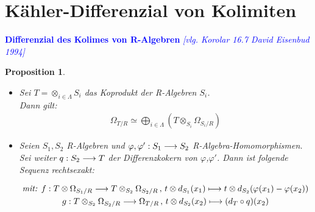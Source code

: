 \documentclass[10pt,a4paper]{report}
\newcommand{\comment}[1]{}
\newcommand{\ModulsOfDifferenzials}{David Eisenbud 1994}
\newcounter{Aussage}[chapter]
\newtheorem{prop}[Aussage]{Proposition}
\newcommand{\functionfront}[3]{\nolinebreak{#1:#2 \longrightarrow #3}}
\newcommand{\function}[5]{\nolinebreak{#1:#2 \longrightarrow #3 \, , \, #4 \longmapsto #5}}
\newcommand{\divR}[2]{\Omega_{#1/#2}}
\newcommand{\divf}[1]{d_{#1}}
\newcommand{\Tensor}[3]{#1 \otimes_{#2} #3}
\newcommand{\tensor}[3]{#1 \otimes #3}
\begin{document}
\section{Kähler-Differenzial von Kolimiten}

\textcolor{blue}{\textbf{Differenzial des Kolimes von R-Algebren} \textit{[vlg. Korolar 16.7 \ModulsOfDifferenzials]}}
\comment{Beide Beweise sind sehr kurz gefasst}
\begin{prop} \label{Differenzial des Kolimes von R-Algebren}
\ \\
\begin{itemize}
\item[\textbf{1.}]
Sei $T = \otimes_{i \in \Lambda} S_i$ das Koprodukt der R-Algebren $S_i$.\\
Dann gilt:
\begin{gather*}
\divR{T}{R} \simeq \bigoplus_{i\in \Lambda} ( \Tensor{T}{S_i}{\divR{S_i}{R}} )
\end{gather*}
\item[\textbf{2.}]
Seien $S_1,S_2$ R-Algebren und $\functionfront{\varphi,\varphi'}{S_1}{S_2}$ R-Algebra-Homomorphismen. Sei weiter $\functionfront{q}{S_2}{T}$ der Differenzkokern von $\varphi$,$\varphi '$.
Dann ist folgende Sequenz rechtsexakt:
\begin{center}
\begin{gather*}
\textit{mit: } \function{f}{\tensor{T}{S_1}{\divR{S_1}{R}}}{\Tensor{T}{S_2}{\divR{S_2}{R}}}{\tensor{t}{S_2}{\divf{S_1}(x_1)}}{\tensor{t}{S_2}{\divf{S_2}(\varphi(x_1) - \varphi(x_2))}}\\
\function{g}{\Tensor{T}{S_2}{\divR{S_2}{R}}}{\divR{T}{R}}{\tensor{t}{S_2}{\divf{S_2}(x_2)}}{(\divf{T}\circ q)(x_2)}
\end{gather*}
\end{center}
\end{itemize}
\end{prop}
\end{document}
